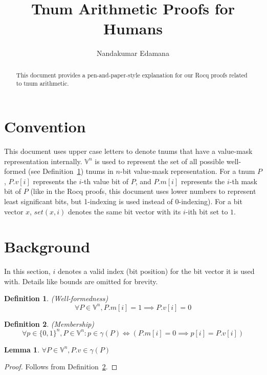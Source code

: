 \documentclass{article}
\newtheorem{lemma}{Lemma}
\newtheorem{definition}{Definition}
\newcommand{\wfdomn}{\mathbb{V}^{n}}
\newcommand{\ith}[1]{#1[i]}
\newcommand{\tv}[1]{#1.v}
\newcommand{\tm}[1]{#1.m}
\newcommand{\ithv}[1]{\ith{\tv{#1}}}
\newcommand{\ithm}[1]{\ith{\tm{#1}}}
\newcommand{\ingamma}[2]{#1 \in \gamma(#2)}
\newcommand{\seti}[1]{set(#1, i)}
\begin{document}
\title{Tnum Arithmetic Proofs for Humans}
\author{Nandakumar Edamana}

\maketitle

\begin{abstract}
  This document provides a pen-and-paper-style explanation for
  our Rocq proofs related to tnum arithmetic.
\end{abstract}

\section{Convention}

This document uses upper case letters to denote tnums that have a
value-mask representation internally.  $\wfdomn$ is used to represent
the set of all possible well-formed (see
Definition~\ref{def:wellformed}) tnums in $n$-bit value-mask
representation.  For a tnum $P$, $\ithv{P}$ represents the $i$-th
value bit of $P$, and $\ithm{P}$ represents the $i$-th mask bit of $P$
(like in the Rocq proofs, this document uses lower numbers to
represent least significant bits, but 1-indexing is used instead of
0-indexing). For a bit vector $x$, $\seti{x}$ denotes the same bit
vector with its $i$-ith bit set to $1$.

\section{Background}

In this section, $i$ denotes a valid index (bit position) for the bit
vector it is used with. Details like bounds are omitted for brevity.

\begin{definition}
  \label{def:wellformed} (Well-formedness)
  $$\forall P \in \wfdomn, \ithm{P} = 1 \implies \ithv{P} = 0$$
\end{definition}

\begin{definition}
  \label{def:ingamma} (Membership)
  $$\forall p \in \{0, 1\}^{n}, P \in \wfdomn : \ingamma{p}{P} \iff (\ithm{P} = 0 \implies \ith{p} = \ithv{P})$$
\end{definition}

\begin{lemma}
  \label{lem:ingamma_value}
  $\forall P \in \wfdomn, \ingamma{\tv{P}}{P}$
\end{lemma}
\begin{proof}
  Follows from Definition~\ref{def:ingamma}.
\end{proof}
\end{document}
